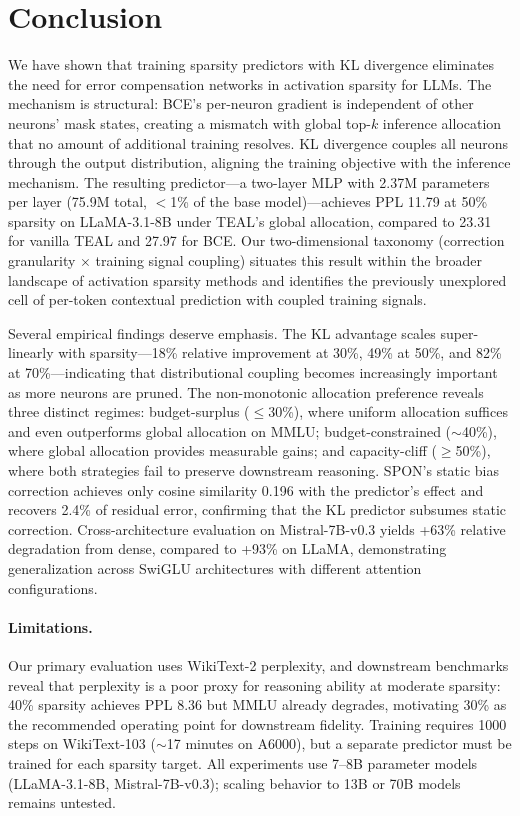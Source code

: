 \section{Conclusion}

We have shown that training sparsity predictors with KL divergence eliminates the need for error compensation networks in activation sparsity for LLMs.
The mechanism is structural: BCE's per-neuron gradient is independent of other neurons' mask states, creating a mismatch with global top-$k$ inference allocation that no amount of additional training resolves.
KL divergence couples all neurons through the output distribution, aligning the training objective with the inference mechanism.
The resulting predictor---a two-layer MLP with 2.37M parameters per layer (75.9M total, $<$1\% of the base model)---achieves PPL 11.79 at 50\% sparsity on LLaMA-3.1-8B under TEAL's global allocation, compared to 23.31 for vanilla TEAL and 27.97 for BCE.
Our two-dimensional taxonomy (correction granularity $\times$ training signal coupling) situates this result within the broader landscape of activation sparsity methods and identifies the previously unexplored cell of per-token contextual prediction with coupled training signals.

Several empirical findings deserve emphasis.
The KL advantage scales super-linearly with sparsity---18\% relative improvement at 30\%, 49\% at 50\%, and 82\% at 70\%---indicating that distributional coupling becomes increasingly important as more neurons are pruned.
The non-monotonic allocation preference reveals three distinct regimes: budget-surplus ($\leq$30\%), where uniform allocation suffices and even outperforms global allocation on MMLU; budget-constrained ($\sim$40\%), where global allocation provides measurable gains; and capacity-cliff ($\geq$50\%), where both strategies fail to preserve downstream reasoning.
SPON's static bias correction achieves only cosine similarity 0.196 with the predictor's effect and recovers 2.4\% of residual error, confirming that the KL predictor subsumes static correction.
Cross-architecture evaluation on Mistral-7B-v0.3 yields +63\% relative degradation from dense, compared to +93\% on LLaMA, demonstrating generalization across SwiGLU architectures with different attention configurations.

\paragraph{Limitations.}
Our primary evaluation uses WikiText-2 perplexity, and downstream benchmarks reveal that perplexity is a poor proxy for reasoning ability at moderate sparsity: 40\% sparsity achieves PPL 8.36 but MMLU already degrades, motivating 30\% as the recommended operating point for downstream fidelity.
Training requires 1000 steps on WikiText-103 ($\sim$17 minutes on A6000), but a separate predictor must be trained for each sparsity target.
All experiments use 7--8B parameter models (LLaMA-3.1-8B, Mistral-7B-v0.3); scaling behavior to 13B or 70B models remains untested.

